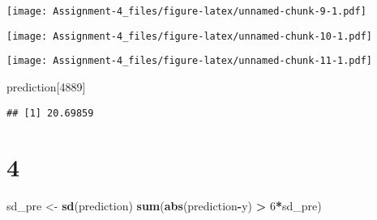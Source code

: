\documentclass[]{article}
\newenvironment{Shaded}{\begin{snugshade}}{\end{snugshade}}
\newcommand{\DataTypeTok}[1]{\textcolor[rgb]{0.13,0.29,0.53}{#1}}
\newcommand{\DecValTok}[1]{\textcolor[rgb]{0.00,0.00,0.81}{#1}}
\newcommand{\KeywordTok}[1]{\textcolor[rgb]{0.13,0.29,0.53}{\textbf{#1}}}
\newcommand{\NormalTok}[1]{#1}
\newcommand{\OperatorTok}[1]{\textcolor[rgb]{0.81,0.36,0.00}{\textbf{#1}}}
\newcommand{\StringTok}[1]{\textcolor[rgb]{0.31,0.60,0.02}{#1}}
\begin{document}
\texttt{[image: Assignment-4\_files/figure-latex/unnamed-chunk-9-1.pdf]}

\begin{Shaded}
\end{Shaded}

\texttt{[image: Assignment-4\_files/figure-latex/unnamed-chunk-10-1.pdf]}

\begin{Shaded}
\end{Shaded}

\texttt{[image: Assignment-4\_files/figure-latex/unnamed-chunk-11-1.pdf]}

\begin{Shaded}
\begin{Highlighting}[]
\NormalTok{prediction[}\DecValTok{4889}\NormalTok{]}
\end{Highlighting}
\end{Shaded}

\begin{verbatim}
## [1] 20.69859
\end{verbatim}

\hypertarget{section-2}{%
\section{4}\label{section-2}}

\begin{Shaded}
\begin{Highlighting}[]
\NormalTok{sd_pre <-}\StringTok{ }\KeywordTok{sd}\NormalTok{(prediction)}
\KeywordTok{sum}\NormalTok{(}\KeywordTok{abs}\NormalTok{(prediction}\OperatorTok{-}\NormalTok{y) }\OperatorTok{>}\StringTok{ }\DecValTok{6}\OperatorTok{*}\NormalTok{sd_pre)}
\end{Highlighting}
\end{Shaded}
\end{document}
